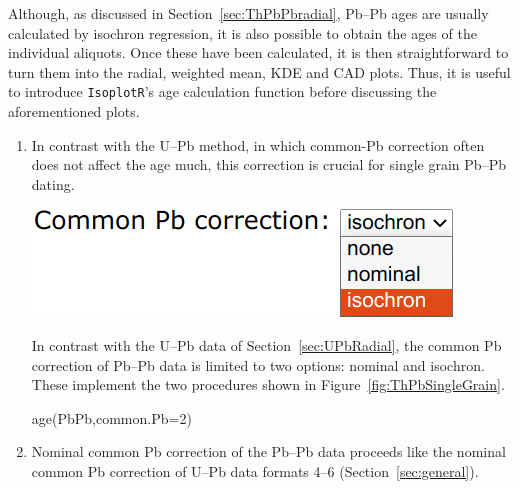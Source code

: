 \begin{refsection}
Although, as discussed in Section~\ref{sec:ThPbPbradial}, Pb--Pb ages
are usually calculated by isochron regression, it is also possible to
obtain the ages of the individual aliquots. Once these have been
calculated, it is then straightforward to turn them into the radial,
weighted mean, KDE and CAD plots. Thus, it is useful to introduce
\texttt{IsoplotR}'s age calculation function before discussing the
aforementioned plots.

\begin{enumerate}

\item In contrast with the U--Pb method, in which common-Pb correction
  often does not affect the age much, this correction is crucial for
  single grain Pb--Pb dating.
  
\noindent\begin{minipage}[t]{.35\linewidth}
\strut\vspace*{-\baselineskip}\newline
\includegraphics[width=\linewidth]{../figures/PbPbRadialPb0.png}
\end{minipage}
\begin{minipage}[t]{.65\linewidth}
  In contrast with the U--Pb data of Section~\ref{sec:UPbRadial}, the
  common Pb correction of Pb--Pb data is limited to two options:
  nominal and isochron. These implement the two procedures shown in
  Figure~\ref{fig:ThPbSingleGrain}.
\end{minipage}

\begin{console}
age(PbPb,common.Pb=2)
\end{console}

\item Nominal common Pb correction of the Pb--Pb data proceeds like
  the nominal common Pb correction of U--Pb data formats 4--6
  (Section~\ref{sec:general}).


\end{enumerate}
\end{refsection}
